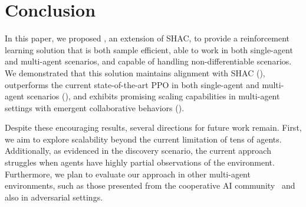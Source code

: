\section{Conclusion}
In this paper, we proposed \fname{}, an extension of SHAC, 
to provide a reinforcement learning solution that is both sample efficient,
able to work in both single-agent and multi-agent scenarios,
and capable of handling non-differentiable scenarios. 
We demonstrated that this solution maintains alignment with SHAC (), outperforms the current state-of-the-art PPO in both single-agent and multi-agent scenarios (), 
and exhibits promising scaling capabilities in multi-agent settings with emergent collaborative behaviors ().

Despite these encouraging results, several directions for future work remain. 
First, we aim to explore scalability beyond the current limitation of tens of agents. 
Additionally, as evidenced in the discovery scenario, the current approach struggles when agents have highly partial observations of the environment. 
Furthermore, we plan to evaluate our approach in other multi-agent environments, such as those presented from the cooperative AI community~\cite{DBLP:journals/corr/abs-2211-13746} and also in adversarial settings. 
